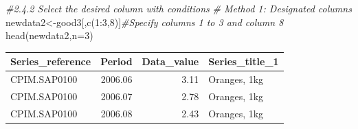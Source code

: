 \documentclass[
  landscape]{article}
\newenvironment{Shaded}{\begin{snugshade}}{\end{snugshade}}
\newcommand{\AttributeTok}[1]{\textcolor[rgb]{0.77,0.63,0.00}{#1}}
\newcommand{\CommentTok}[1]{\textcolor[rgb]{0.56,0.35,0.01}{\textit{#1}}}
\newcommand{\DecValTok}[1]{\textcolor[rgb]{0.00,0.00,0.81}{#1}}
\newcommand{\FunctionTok}[1]{\textcolor[rgb]{0.00,0.00,0.00}{#1}}
\newcommand{\NormalTok}[1]{#1}
\newcommand{\OtherTok}[1]{\textcolor[rgb]{0.56,0.35,0.01}{#1}}
\newcommand{\SpecialCharTok}[1]{\textcolor[rgb]{0.00,0.00,0.00}{#1}}
\newcommand{\StringTok}[1]{\textcolor[rgb]{0.31,0.60,0.02}{#1}}
\begin{document}
\begin{Shaded}
\begin{Highlighting}[]
\CommentTok{\#2.4.2 Select the desired column with conditions}
\CommentTok{\# Method 1: Designated columns}
\NormalTok{newdata2}\OtherTok{\textless{}{-}}\NormalTok{good3[,}\FunctionTok{c}\NormalTok{(}\DecValTok{1}\SpecialCharTok{:}\DecValTok{3}\NormalTok{,}\DecValTok{8}\NormalTok{)]}\CommentTok{\#Specify columns 1 to 3 and column 8}
\FunctionTok{head}\NormalTok{(newdata2,}\AttributeTok{n=}\DecValTok{3}\NormalTok{)}
\end{Highlighting}
\end{Shaded}

\begin{longtable}[]{@{}lrrl@{}}
\toprule
Series\_reference & Period & Data\_value & Series\_title\_1 \\
\midrule
\endhead
CPIM.SAP0100 & 2006.06 & 3.11 & Oranges, 1kg \\
CPIM.SAP0100 & 2006.07 & 2.78 & Oranges, 1kg \\
CPIM.SAP0100 & 2006.08 & 2.43 & Oranges, 1kg \\
\bottomrule
\end{longtable}

\begin{Shaded}
\end{Shaded}
\end{document}
